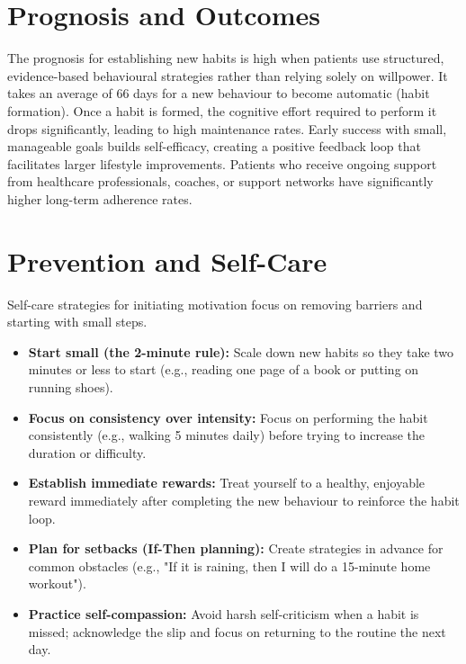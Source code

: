 \section*{Prognosis and Outcomes}
The prognosis for establishing new habits is high when patients use structured, evidence-based behavioural strategies rather than relying solely on willpower. It takes an average of 66 days for a new behaviour to become automatic (habit formation). Once a habit is formed, the cognitive effort required to perform it drops significantly, leading to high maintenance rates. Early success with small, manageable goals builds self-efficacy, creating a positive feedback loop that facilitates larger lifestyle improvements. Patients who receive ongoing support from healthcare professionals, coaches, or support networks have significantly higher long-term adherence rates.

\section*{Prevention and Self-Care}
Self-care strategies for initiating motivation focus on removing barriers and starting with small steps.
\begin{itemize}
    \item \textbf{Start small (the 2-minute rule):} Scale down new habits so they take two minutes or less to start (e.g., reading one page of a book or putting on running shoes).
    \item \textbf{Focus on consistency over intensity:} Focus on performing the habit consistently (e.g., walking 5 minutes daily) before trying to increase the duration or difficulty.
    \item \textbf{Establish immediate rewards:} Treat yourself to a healthy, enjoyable reward immediately after completing the new behaviour to reinforce the habit loop.
    \item \textbf{Plan for setbacks (If-Then planning):} Create strategies in advance for common obstacles (e.g., "If it is raining, then I will do a 15-minute home workout").
    \item \textbf{Practice self-compassion:} Avoid harsh self-criticism when a habit is missed; acknowledge the slip and focus on returning to the routine the next day.
\end{itemize}

